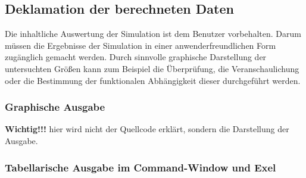 \subsection{Deklamation der berechneten Daten}

Die inhaltliche Auswertung der Simulation ist dem Benutzer vorbehalten. Darum müssen die Ergebnisse der Simulation in einer
anwenderfreundlichen Form zugänglich gemacht werden. Durch sinnvolle graphische Darstellung der untersuchten Größen kann zum
Beispiel die Überprüfung, die Veranschaulichung oder die Bestimmung der funktionalen Abhängigkeit dieser durchgeführt werden.


\subsubsection{Graphische Ausgabe}
\textbf{Wichtig!!!} hier wird nicht der Quellcode erklärt, sondern die Darstellung der Ausgabe.
\subsubsection{Tabellarische Ausgabe im Command-Window und Exel}

